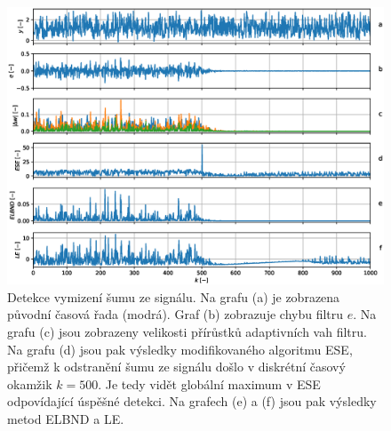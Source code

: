 \begin{figure}[ht!] 
    \centering
    \includegraphics[scale=0.6]{IMG/mdpi/noise_ext.eps} 
    \caption{Detekce vymizení šumu ze signálu. Na grafu (a) je zobrazena původní časová řada (modrá). Graf (b) zobrazuje chybu filtru $e$. Na grafu (c) jsou zobrazeny velikosti přírůstků adaptivních vah filtru. Na grafu (d) jsou pak výsledky modifikovaného algoritmu ESE, přičemž k odstranění šumu ze signálu došlo v diskrétní časový okamžik $k=500$. Je tedy vidět globální maximum v ESE odpovídající úspěšné detekci. Na grafech (e) a (f) jsou pak výsledky metod ELBND a LE.}
    \label{fig:noise_ext}
\end{figure}


